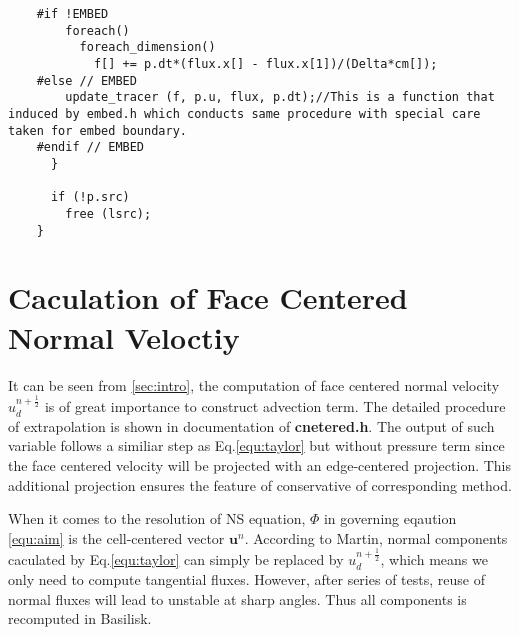 \documentclass[a4paper]{article}
\newcommand{\para}[1]{\textbf{\emph{\textcolor{para}{#1}}}}
\begin{document}
\begin{center}
\end{center}


\begin{multicols}{2}
  \columnbreak
  \begin{verbatim}
    #if !EMBED
        foreach()
          foreach_dimension()
            f[] += p.dt*(flux.x[] - flux.x[1])/(Delta*cm[]);
    #else // EMBED
        update_tracer (f, p.u, flux, p.dt);//This is a function that induced by embed.h which conducts same procedure with special care taken for embed boundary.
    #endif // EMBED
      }

      if (!p.src)
        free (lsrc);
    }
  \end{verbatim}
\end{multicols}

\appendix
\section{Caculation of Face Centered Normal Veloctiy}
It can be seen from \ref{sec:intro}, the computation of face centered normal velocity $u_d^{n+ \frac{1}{2}}$ is of great importance to construct advection term. The detailed procedure of extrapolation is shown in documentation of \textbf{cnetered.h}. The output of such variable follows a similiar step as Eq.\ref{equ:taylor} but without pressure term since the face centered velocity will be projected with an edge-centered projection. This additional projection ensures the feature of conservative of corresponding method.\par
When it comes to the resolution of NS equation, $\Phi$ in governing eqaution \ref{equ:aim} is the cell-centered vector $ \mathbf{u}^n$. According to Martin\cite{martin2000cell}, normal components caculated by Eq.\ref{equ:taylor} can simply be replaced by $u_d^{n+ \frac{1}{2}}$, which means we only need to compute tangential fluxes. However, after series of tests, reuse of normal fluxes will lead to unstable at sharp angles. Thus all components is recomputed in Basilisk\cite{popinet2003gerris}.
\printbibliography
\end{document}
